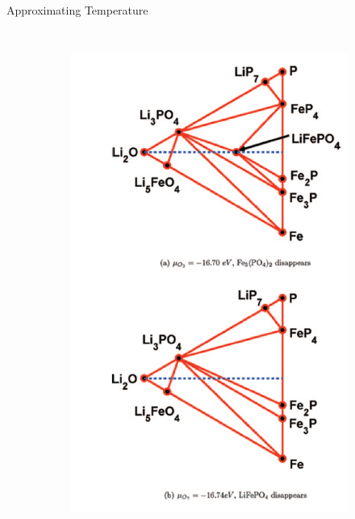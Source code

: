 \documentclass[aspectratio=169]{beamer}
\begin{document}
\begin{frame}{Approximating Temperature}
\begin{columns}
\begin{figure}
\begin{subfigure}{0.47\textwidth}
                    \includegraphics[width=\linewidth]{lectures/figures/10_LFP_PD2.png}
                \end{subfigure}
            \end{figure}
        \end{columns}
    \end{frame}
\end{document}
